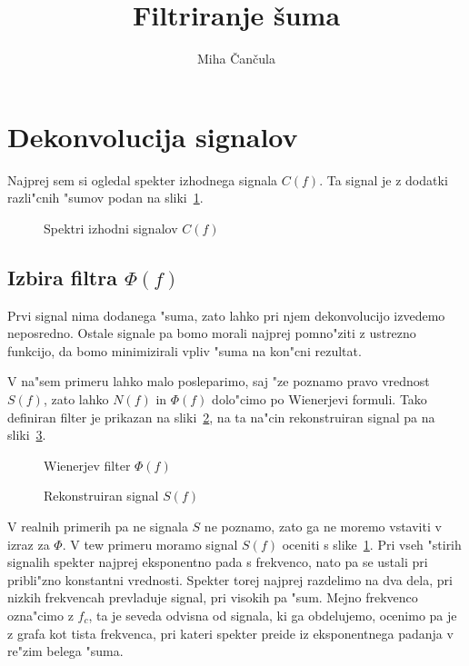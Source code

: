 \documentclass[a4paper,10pt]{article}
\title{Filtriranje \v suma}
\author{Miha \v Can\v cula}
\begin{document}
\maketitle

\section{Dekonvolucija signalov}

Najprej sem si ogledal spekter izhodnega signala $C(f)$. Ta signal je z dodatki razli"cnih "sumov podan na sliki~\ref{fig:signal-fft}. 

\begin{figure}

\caption{Spektri izhodni signalov $C(f)$}
\label{fig:signal-fft}
\end{figure}

\subsection{Izbira filtra $\Phi(f)$}

Prvi signal nima dodanega "suma, zato lahko pri njem dekonvolucijo izvedemo neposredno. Ostale signale pa bomo morali najprej pomno"ziti z ustrezno funkcijo, da bomo minimizirali vpliv "suma na kon"cni rezultat. 

V na"sem primeru lahko malo posleparimo, saj "ze poznamo pravo vrednost $S(f)$, zato lahko $N(f)$ in $\Phi(f)$ dolo"cimo po Wienerjevi formuli. Tako definiran filter je prikazan na sliki~\ref{fig:signal-filter}, na ta na"cin rekonstruiran signal pa na sliki~\ref{fig:signal-rekonstruiran}. 

\begin{figure}

\caption{Wienerjev filter $\Phi(f)$}
\label{fig:signal-filter}
\end{figure}

\begin{figure}

\caption{Rekonstruiran signal $S(f)$}
\label{fig:signal-rekonstruiran}
\end{figure}

V realnih primerih pa ne signala $S$ ne poznamo, zato ga ne moremo vstaviti v izraz za $\Phi$. V tew primeru moramo signal $S(f)$ oceniti s slike~\ref{fig:signal-fft}. Pri vseh "stirih signalih spekter najprej eksponentno pada s frekvenco, nato pa se ustali pri pribli"zno konstantni vrednosti. Spekter torej najprej razdelimo na dva dela, pri nizkih frekvencah prevladuje signal, pri visokih pa "sum. Mejno frekvenco ozna"cimo z $f_c$, ta je seveda odvisna od signala, ki ga obdelujemo, ocenimo pa je z grafa kot tista frekvenca, pri kateri spekter preide iz eksponentnega padanja v re"zim belega "suma. 
\end{document}
